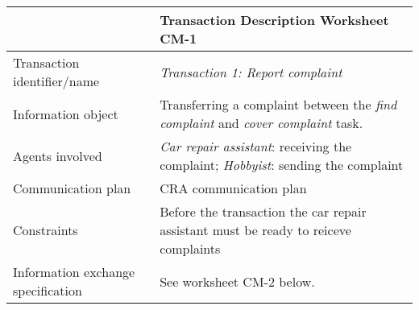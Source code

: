 \noindent
\begin{tabular}{%
       |>{\colleft}p{3cm}%
       |>{\colleft}p{8.5cm}|}
\hline
{\bf Communication model} &
   {\bf Transaction Description Worksheet CM-1} \\
\hline
\hline
\sc Transaction identifier/name &
	\emph{Transaction 1: Report complaint} \\

\hline
\sc Information object &
	Transferring a complaint between the \emph{find complaint} and \emph{cover complaint} task. \\
\hline
\sc Agents involved &
	\emph{Car repair assistant}: receiving the complaint;\newline
	\emph{Hobbyist}: sending the complaint\\
\hline
\sc Communication plan &
	CRA communication plan\\

\hline
\sc Constraints &
	Before the transaction the car repair assistant must be ready to reiceve complaints\\

\hline
\sc Information exchange specification &
	See worksheet CM-2 below.\\

\hline
\end{tabular}


